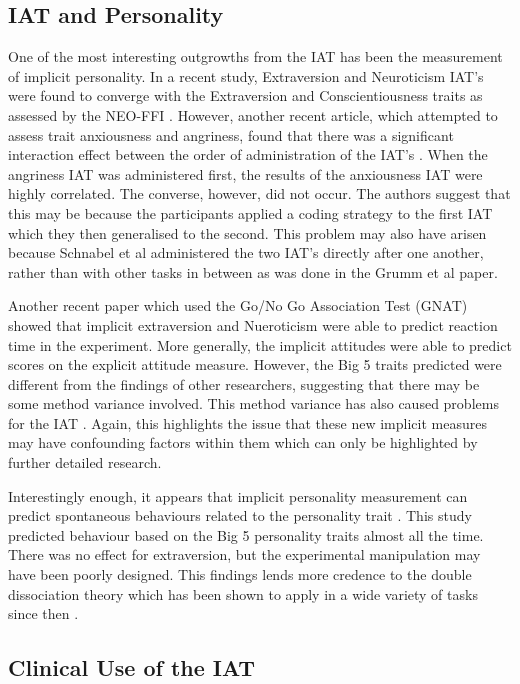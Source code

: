 \subsection{IAT and Personality}

One of the most interesting outgrowths from the IAT has been the measurement of implicit personality. In a recent study, Extraversion and Neuroticism IAT's were found to converge with the Extraversion and Conscientiousness traits as assessed by the NEO-FFI \cite{Grumm2007} . However, another recent article, which attempted to assess trait anxiousness and angriness, found that there was a significant interaction effect between the order of administration of the IAT's \cite{Schnabel2006}. When the angriness IAT was administered first, the results of the anxiousness IAT were highly correlated. The converse, however, did not occur. The authors suggest that this may be because the participants applied a coding strategy to the first IAT which they then generalised to the second. This problem may also have arisen because Schnabel et al administered the two IAT's directly after one another, rather than with other tasks in between as was done in the Grumm et al paper. 

Another recent paper \cite{Boldero2007} which used the Go/No Go Association Test (GNAT) showed that implicit extraversion and Nueroticism were able to predict reaction time in the experiment. More generally, the implicit attitudes were able to predict scores on the explicit attitude measure. However, the Big 5 traits predicted were different from the findings of other researchers, suggesting that there may be some method variance involved. This method variance has also caused problems for the IAT \cite{Mierke2003,Greenwald2003a} . Again, this highlights the issue that these new implicit measures may have confounding factors within them which can only be highlighted by further detailed research.

Interestingly enough, it appears that implicit personality measurement can predict spontaneous behaviours related to the personality trait \cite{Steffens2006}. This study predicted behaviour based on the Big 5 personality traits almost all the time. There was no effect for extraversion, but the experimental manipulation may have been poorly designed. This findings lends more credence to the double dissociation theory \cite{Asendorpf2002} which has been shown to apply in a wide variety of tasks since then \cite{Perugini2005}. 

\subsection{Clinical Use of the IAT}

